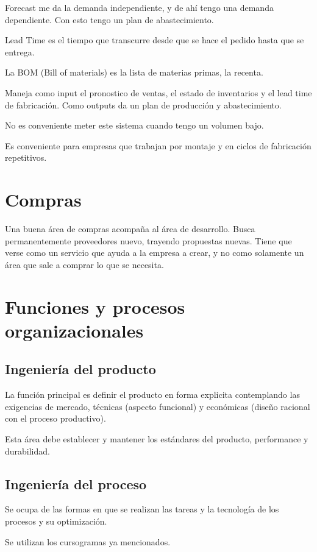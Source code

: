 \documentclass[titlepage,a4paper]{article}
\begin{document}
Forecast me da la demanda independiente, y de ahí tengo una demanda dependiente. Con esto tengo un plan de abastecimiento.

Lead Time es el tiempo que transcurre desde que se hace el pedido hasta que se entrega.


La BOM (Bill of materials) es la lista de materias primas, la recenta.

Maneja como input el pronostico de ventas, el estado de inventarios y el lead time de fabricación. Como outputs da un plan de producción y abastecimiento.

No es conveniente meter este sistema cuando tengo un volumen bajo.


Es conveniente para empresas que trabajan por montaje y en ciclos de fabricación repetitivos.

\section{Compras}
Una buena área de compras acompaña al área de desarrollo. Busca permanentemente proveedores nuevo, trayendo propuestas nuevas. Tiene que verse como un servicio que ayuda a la empresa a crear, y no como solamente un área que sale a comprar lo que se necesita.



\section{Funciones y procesos organizacionales}
\subsection{Ingeniería del producto}
La función principal es definir el producto en forma explicita contemplando las exigencias de mercado, técnicas (aspecto funcional) y económicas (diseño racional con el proceso productivo).

Esta área debe establecer y mantener los estándares del producto, performance y durabilidad.

\subsection{Ingeniería del proceso}
Se ocupa de las formas en que se realizan las tareas y la tecnología de los procesos y su optimización.

Se utilizan los cursogramas ya mencionados.
\end{document}
